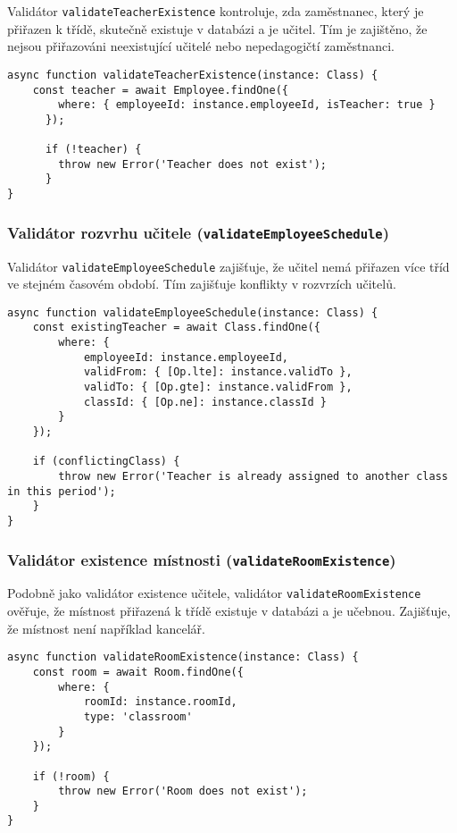 Validátor \texttt{validateTeacherExistence} kontroluje, zda zaměstnanec, který je přiřazen k třídě, skutečně existuje v databázi a je učitel. Tím je zajištěno, že nejsou přiřazováni neexistující učitelé nebo nepedagogičtí zaměstnanci.

\begin{lstlisting}[title=Kód validátoru existence učitele]
async function validateTeacherExistence(instance: Class) {
    const teacher = await Employee.findOne({
        where: { employeeId: instance.employeeId, isTeacher: true }
      });
    
      if (!teacher) {
        throw new Error('Teacher does not exist');
      }
}
\end{lstlisting}

\subsubsection*{Validátor rozvrhu učitele (\texttt{validateEmployeeSchedule})}

Validátor \texttt{validateEmployeeSchedule} zajišťuje, že učitel nemá přiřazen více tříd ve stejném časovém období. Tím zajišťuje konflikty v rozvrzích učitelů.

\newpage
\begin{lstlisting}[title=Kód validátoru rozvrhu učitele]
async function validateEmployeeSchedule(instance: Class) {
    const existingTeacher = await Class.findOne({
        where: {
            employeeId: instance.employeeId,
            validFrom: { [Op.lte]: instance.validTo },
            validTo: { [Op.gte]: instance.validFrom },
            classId: { [Op.ne]: instance.classId }
        }
    });

    if (conflictingClass) {
        throw new Error('Teacher is already assigned to another class in this period');
    }
}
\end{lstlisting}

\subsubsection*{Validátor existence místnosti (\texttt{validateRoomExistence})}

Podobně jako validátor existence učitele, validátor \texttt{validateRoomExistence} ověřuje, že místnost přiřazená k třídě existuje v databázi a je učebnou. Zajišťuje, že místnost není například kancelář.

\begin{lstlisting}[title=Kód validátoru existence místnosti]
async function validateRoomExistence(instance: Class) {
    const room = await Room.findOne({ 
        where: { 
            roomId: instance.roomId,
            type: 'classroom'
        } 
    });
    
    if (!room) {
        throw new Error('Room does not exist');
    }
}
\end{lstlisting}

